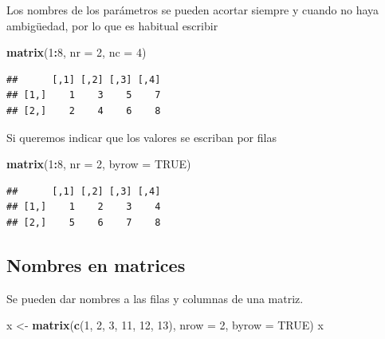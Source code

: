 \documentclass[]{book}
\newenvironment{Shaded}{\begin{snugshade}}{\end{snugshade}}
\newcommand{\KeywordTok}[1]{\textcolor[rgb]{0.13,0.29,0.53}{\textbf{#1}}}
\newcommand{\DataTypeTok}[1]{\textcolor[rgb]{0.13,0.29,0.53}{#1}}
\newcommand{\DecValTok}[1]{\textcolor[rgb]{0.00,0.00,0.81}{#1}}
\newcommand{\StringTok}[1]{\textcolor[rgb]{0.31,0.60,0.02}{#1}}
\newcommand{\OtherTok}[1]{\textcolor[rgb]{0.56,0.35,0.01}{#1}}
\newcommand{\OperatorTok}[1]{\textcolor[rgb]{0.81,0.36,0.00}{\textbf{#1}}}
\newcommand{\NormalTok}[1]{#1}
\begin{document}
Los nombres de los parámetros se pueden acortar siempre y cuando no haya
ambigüedad, por lo que es habitual escribir

\begin{Shaded}
\begin{Highlighting}[]
\KeywordTok{matrix}\NormalTok{(}\DecValTok{1}\OperatorTok{:}\DecValTok{8}\NormalTok{, }\DataTypeTok{nr =} \DecValTok{2}\NormalTok{, }\DataTypeTok{nc =} \DecValTok{4}\NormalTok{)}
\end{Highlighting}
\end{Shaded}

\begin{verbatim}
##      [,1] [,2] [,3] [,4]
## [1,]    1    3    5    7
## [2,]    2    4    6    8
\end{verbatim}

Si queremos indicar que los valores se escriban por filas

\begin{Shaded}
\begin{Highlighting}[]
\KeywordTok{matrix}\NormalTok{(}\DecValTok{1}\OperatorTok{:}\DecValTok{8}\NormalTok{, }\DataTypeTok{nr =} \DecValTok{2}\NormalTok{, }\DataTypeTok{byrow =} \OtherTok{TRUE}\NormalTok{)}
\end{Highlighting}
\end{Shaded}

\begin{verbatim}
##      [,1] [,2] [,3] [,4]
## [1,]    1    2    3    4
## [2,]    5    6    7    8
\end{verbatim}

\subsection{Nombres en matrices}\label{nombres-en-matrices}

Se pueden dar nombres a las filas y columnas de una matriz.

\begin{Shaded}
\begin{Highlighting}[]
\NormalTok{x <-}\StringTok{ }\KeywordTok{matrix}\NormalTok{(}\KeywordTok{c}\NormalTok{(}\DecValTok{1}\NormalTok{, }\DecValTok{2}\NormalTok{, }\DecValTok{3}\NormalTok{, }\DecValTok{11}\NormalTok{, }\DecValTok{12}\NormalTok{, }\DecValTok{13}\NormalTok{), }\DataTypeTok{nrow =} \DecValTok{2}\NormalTok{, }\DataTypeTok{byrow =} \OtherTok{TRUE}\NormalTok{)}
\NormalTok{x}
\end{Highlighting}
\end{Shaded}
\end{document}
